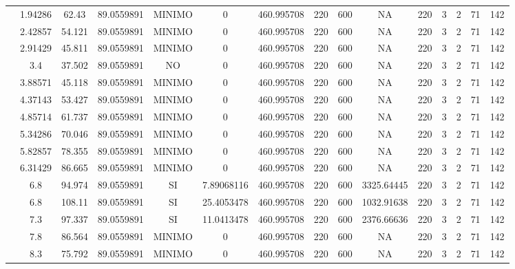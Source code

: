 \begin{table}[H]
{\begin{tabular}{|c|c|c|c|c|c|c|c|c|c|c|c|c|c|c|}
\cline{2-15}    & 1.94286 & 62.43 & 89.0559891 & MINIMO & 0   & 460.995708 & 220 & 600 & NA  & 220 & 3   & 2   & 71  & 142 \bigstrut\\
\cline{2-15}    & 2.42857 & 54.121 & 89.0559891 & MINIMO & 0   & 460.995708 & 220 & 600 & NA  & 220 & 3   & 2   & 71  & 142 \bigstrut\\
\cline{2-15}    & 2.91429 & 45.811 & 89.0559891 & MINIMO & 0   & 460.995708 & 220 & 600 & NA  & 220 & 3   & 2   & 71  & 142 \bigstrut\\
\cline{2-15}    & 3.4 & 37.502 & 89.0559891 & NO  & 0   & 460.995708 & 220 & 600 & NA  & 220 & 3   & 2   & 71  & 142 \bigstrut\\
\cline{2-15}    & 3.88571 & 45.118 & 89.0559891 & MINIMO & 0   & 460.995708 & 220 & 600 & NA  & 220 & 3   & 2   & 71  & 142 \bigstrut\\
\cline{2-15}    & 4.37143 & 53.427 & 89.0559891 & MINIMO & 0   & 460.995708 & 220 & 600 & NA  & 220 & 3   & 2   & 71  & 142 \bigstrut\\
\cline{2-15}    & 4.85714 & 61.737 & 89.0559891 & MINIMO & 0   & 460.995708 & 220 & 600 & NA  & 220 & 3   & 2   & 71  & 142 \bigstrut\\
\cline{2-15}    & 5.34286 & 70.046 & 89.0559891 & MINIMO & 0   & 460.995708 & 220 & 600 & NA  & 220 & 3   & 2   & 71  & 142 \bigstrut\\
\cline{2-15}    & 5.82857 & 78.355 & 89.0559891 & MINIMO & 0   & 460.995708 & 220 & 600 & NA  & 220 & 3   & 2   & 71  & 142 \bigstrut\\
\cline{2-15}    & 6.31429 & 86.665 & 89.0559891 & MINIMO & 0   & 460.995708 & 220 & 600 & NA  & 220 & 3   & 2   & 71  & 142 \bigstrut\\
\cline{2-15}    & 6.8 & 94.974 & 89.0559891 & SI  & 7.89068116 & 460.995708 & 220 & 600 & 3325.64445 & 220 & 3   & 2   & 71  & 142 \bigstrut\\
\cline{2-15}    & 6.8 & 108.11 & 89.0559891 & SI  & 25.4053478 & 460.995708 & 220 & 600 & 1032.91638 & 220 & 3   & 2   & 71  & 142 \bigstrut\\
\cline{2-15}    & 7.3 & 97.337 & 89.0559891 & SI  & 11.0413478 & 460.995708 & 220 & 600 & 2376.66636 & 220 & 3   & 2   & 71  & 142 \bigstrut\\
\cline{2-15}    & 7.8 & 86.564 & 89.0559891 & MINIMO & 0   & 460.995708 & 220 & 600 & NA  & 220 & 3   & 2   & 71  & 142 \bigstrut\\
\cline{2-15}    & 8.3 & 75.792 & 89.0559891 & MINIMO & 0   & 460.995708 & 220 & 600 & NA  & 220 & 3   & 2   & 71  & 142 \bigstrut\\

\end{tabular}}
\end{table}
